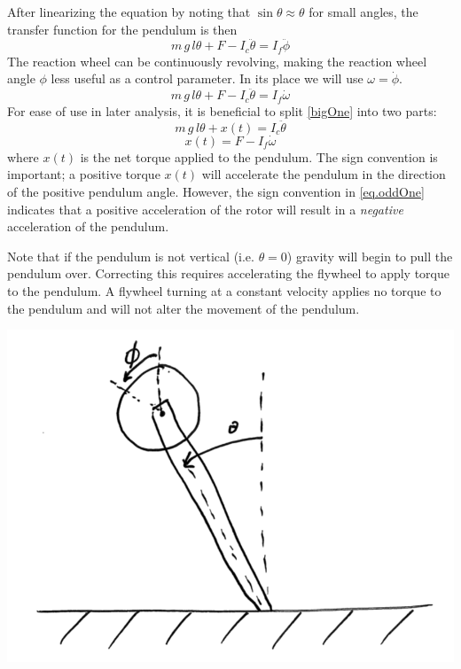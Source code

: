 \documentclass[12pt,letterpaper]{article}
\begin{document}
After linearizing the equation by noting that $\sin{\theta} \approx \theta$ for small angles, 
the transfer function for the pendulum is then
%
\begin{equation}
    m \,g \,l \theta + F - I_{c}\ddot{\theta}  = I_{f}\ddot{\phi}
\end{equation}
%
The reaction wheel can be continuously revolving, making the reaction wheel angle $\phi$ less useful as a control parameter.
In its place we will use $\omega = \dot{\phi}$.
%
\begin{equation}
    m \,g \,l \theta + F - I_{c}\ddot{\theta}  = I_{f}\dot{\omega}\label{bigOne}
\end{equation}
%
For ease of use in later analysis, it is beneficial to split \eqref{bigOne} into two parts:
%
\begin{equation}
    m \,g \,l \theta + x(t)   = I_{c}\ddot{\theta}\label{eq.pendulum}
\end{equation}
%
\begin{equation}
    x(t) = F - I_{f}\dot{\omega}\label{eq.oddOne}
\end{equation}
%
where $x(t)$ is the net torque applied to the pendulum.  The sign convention is important; a positive torque $x(t)$
will accelerate the pendulum in the direction of the positive pendulum angle.  However, the sign convention in 
\eqref{eq.oddOne} indicates that  a positive acceleration of the rotor will result in a \textit{negative} acceleration of the pendulum.

Note that if the pendulum is not vertical (i.e. $\theta = 0$) gravity will begin to pull the pendulum over.  Correcting this requires accelerating the flywheel to apply torque to the pendulum.  A flywheel turning at a constant velocity applies no torque to the pendulum and will not alter the movement of the pendulum.



\includegraphics[width=\textwidth]{images/scan1.png}
    \label{modelOfPendulum}
\end{document}
